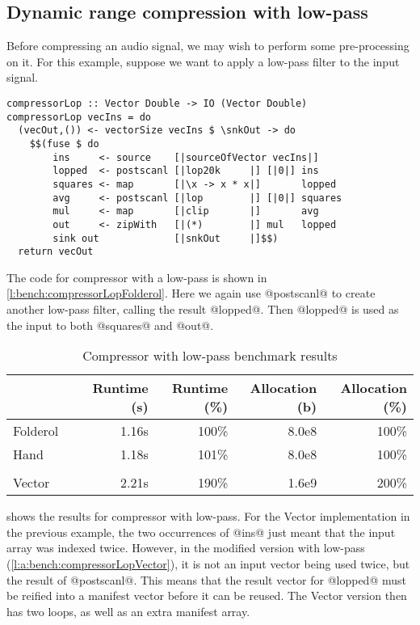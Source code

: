 \subsection{Dynamic range compression with low-pass}
Before compressing an audio signal, we may wish to perform some pre-processing on it.
For this example, suppose we want to apply a low-pass filter to the input signal.

\begin{lstlisting}[float,label=l:bench:compressorLopFolderol,caption=Folderol implementation of compressor with low-pass]
compressorLop :: Vector Double -> IO (Vector Double)
compressorLop vecIns = do
  (vecOut,()) <- vectorSize vecIns $ \snkOut -> do
    $$(fuse $ do
        ins     <- source    [|sourceOfVector vecIns|]
        lopped  <- postscanl [|lop20k     |] [|0|] ins
        squares <- map       [|\x -> x * x|]       lopped
        avg     <- postscanl [|lop        |] [|0|] squares
        mul     <- map       [|clip       |]       avg
        out     <- zipWith   [|(*)        |] mul   lopped
        sink out             [|snkOut     |]$$)
  return vecOut
\end{lstlisting}

The code for compressor with a low-pass is shown in \cref{l:bench:compressorLopFolderol}.
Here we again use @postscanl@ to create another low-pass filter, calling the result @lopped@.
Then @lopped@ is used as the input to both @squares@ and @out@.

\begin{table}
\begin{center}
\begin{tabular}{ll|rrrr}
& & Runtime (s)  & Runtime (\%) & Allocation (b) & Allocation (\%) \\
\hline
Folderol &          & 1.16s &   100\% & 8.0e8 & 100\% \\
Hand     &          & 1.18s &   101\% & 8.0e8 & 100\% \\
&&&\\
Vector &            & 2.21s &   190\% & 1.6e9 & 200\%\\
\end{tabular}
\end{center}
\caption[Compressor with low-pass benchmark results]{Compressor with low-pass benchmark results}
\label{table:bench:compressorlop}
\end{table}

 shows the results for compressor with low-pass.
For the Vector implementation in the previous example, the two occurrences of @ins@ just meant that the input array was indexed twice.
However, in the modified version with low-pass (\cref{l:a:bench:compressorLopVector}), it is not an input vector being used twice, but the result of @postscanl@.
This means that the result vector for @lopped@ must be reified into a manifest vector before it can be reused.
The Vector version then has two loops, as well as an extra manifest array.





